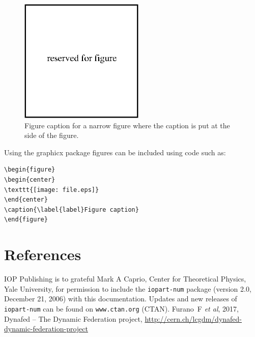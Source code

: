 \documentclass[a4paper]{jpconf}
\begin{document}
\begin{figure}[h]
\includegraphics[width=14pc]{name.eps}\hspace{2pc}%
\begin{minipage}[b]{14pc}\caption{\label{label}Figure caption for a narrow figure where the caption is put at the side of the figure.}
\end{minipage}
\end{figure}

Using the graphicx package figures can be included using code such as:
\begin{verbatim}
\begin{figure}
\begin{center}
\texttt{[image: file.eps]}
\end{center}
\caption{\label{label}Figure caption}
\end{figure}
\end{verbatim}

\section*{References}
\begin{thebibliography}{9}
 IOP Publishing is to grateful Mark A Caprio, Center for Theoretical Physics, Yale University, for permission to include the {\tt iopart-num} \BibTeX package (version 2.0, December 21, 2006) with  this documentation. Updates and new releases of {\tt iopart-num} can be found on \verb"www.ctan.org" (CTAN).
 Furano~F {\it et al}, 2017, Dynafed -- The Dynamic Federation project, \url{http://cern.ch/lcgdm/dynafed-dynamic-federation-project}

\end{thebibliography}
\end{document}
